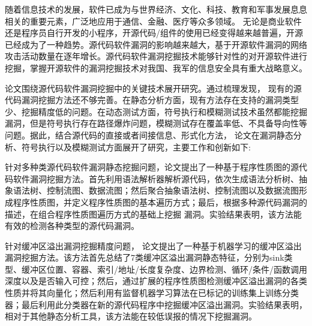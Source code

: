 \begin{cabstract}
随着信息技术的发展，软件已成为与世界经济、文化、科技、教育和军事发展息息相关的重要元素，广泛地应用于通信、金融、医疗等众多领域。 %
无论是商业软件还是程序员自行开发的小程序，开源代码/组件的使用已经变得越来越普遍，开源已经成为了一种趋势。源代码软件漏洞的影响越来越大，基于开源软件漏洞的网络攻击活动数量在逐年增长。源代码软件漏洞挖掘技术能够针对性的对开源软件进行挖掘，掌握开源软件的漏洞挖掘技术对我国、我军的信息安全具有重大战略意义。

论文围绕源代码软件漏洞挖掘中的关键技术展开研究。通过梳理发现， %
现有的源代码漏洞挖掘方法还不够完善。在静态分析方面，现有方法存在支持的漏洞类型少、挖掘精度低的问题。在动态测试方面，符号执行和模糊测试技术虽然都能挖掘漏洞，但是符号执行存在路径爆炸问题，模糊测试存在覆盖率低、不具备导向性等问题。据此，结合源代码的直接或者间接信息、形式化方法，
论文在漏洞静态分析、符号执行以及模糊测试方面展开了研究，主要工作和创新如下:


针对多种类源代码软件漏洞静态挖掘问题，论文提出了一种基于程序性质图的源代码软件漏洞挖掘方法。首先利用语法解析器解析源代码，依次生成语法分析树、抽象语法树、控制流图、数据流图；然后聚合抽象语法树、控制流图以及数据流图形成程序性质图，并定义程序性质图的基本遍历方式；最后，根据多种源代码漏洞的描述，在组合程序性质图遍历方式的基础上挖掘
漏洞。实验结果表明，该方法能有效的检测各种类型的源代码漏洞。

针对缓冲区溢出漏洞挖掘精度问题，
论文提出了一种基于机器学习的缓冲区溢出漏洞挖掘方法。该方法首先总结了7类缓冲区溢出漏洞静态特征，分别为sink类型、缓冲区位置、容器、索引/地址/长度复杂度、边界检测、循环/条件/函数调用深度以及是否输入可控；然后，通过扩展的程序性质图检测缓冲区溢出漏洞的各类性质并将其向量化；然后利用有监督机器学习算法在已标记的训练集上训练分类器；最后利用此分类器在新的源代码程序中挖掘缓冲区溢出漏洞。实验结果表明，相对于其他静态分析工具，该方法能在较低误报的情况下挖掘漏洞。


\end{cabstract}
